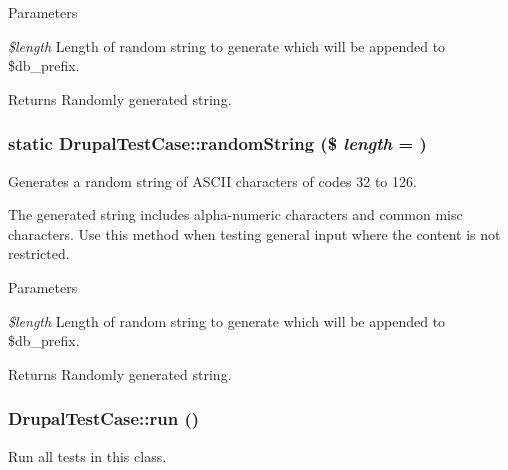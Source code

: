 \begin{DoxyParams}{Parameters}
\item[{\em \$length}]Length of random string to generate which will be appended to \$db\_\-prefix. \end{DoxyParams}
\begin{DoxyReturn}{Returns}
Randomly generated string. 
\end{DoxyReturn}
\hypertarget{class_drupal_test_case_abfa086de79b5d644f10d4bd4d828136c}{
\subsubsection[{randomString}]{\setlength{\rightskip}{0pt plus 5cm}static DrupalTestCase::randomString (\$ {\em length} = {})}}
\label{class_drupal_test_case_abfa086de79b5d644f10d4bd4d828136c}
Generates a random string of ASCII characters of codes 32 to 126.

The generated string includes alpha-\/numeric characters and common misc characters. Use this method when testing general input where the content is not restricted.


\begin{DoxyParams}{Parameters}
\item[{\em \$length}]Length of random string to generate which will be appended to \$db\_\-prefix. \end{DoxyParams}
\begin{DoxyReturn}{Returns}
Randomly generated string. 
\end{DoxyReturn}
\hypertarget{class_drupal_test_case_a01b1f3d8f92bb804dbfbbb9c03664a8e}{
\subsubsection[{run}]{\setlength{\rightskip}{0pt plus 5cm}DrupalTestCase::run ()}}
\label{class_drupal_test_case_a01b1f3d8f92bb804dbfbbb9c03664a8e}
Run all tests in this class. 

